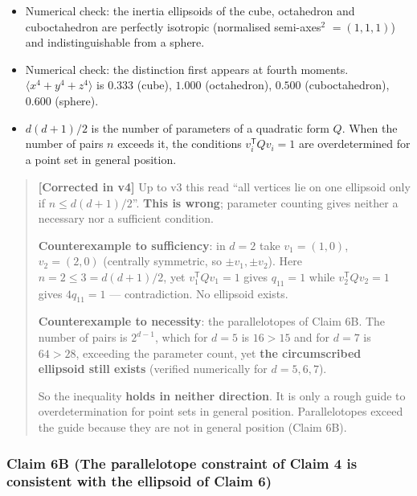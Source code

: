 \documentclass[
  10pt,
]{article}
\providecommand{\tightlist}{%
  \setlength{\itemsep}{0pt}\setlength{\parskip}{0pt}}
\begin{document}
\begin{itemize}
\tightlist
\item
  Numerical check: the inertia ellipsoids of the cube, octahedron and
  cuboctahedron are perfectly isotropic (normalised semi-axes\(^2\)
  \(=(1,1,1)\)) and indistinguishable from a sphere.
\item
  Numerical check: the distinction first appears at fourth moments.
  \(\langle x^4+y^4+z^4\rangle\) is \(0.333\) (cube), \(1.000\)
  (octahedron), \(0.500\) (cuboctahedron), \(0.600\) (sphere).
\item
  \(d(d+1)/2\) is the number of parameters of a quadratic form \(Q\).
  When the number of pairs \(n\) exceeds it, the conditions
  \(v_i^{\mathsf T}Qv_i = 1\) are overdetermined for a point set in
  general position.
\end{itemize}

\begin{quote}
\textbf{{[}Corrected in v4{]}} Up to v3 this read ``all vertices lie on
one ellipsoid only if \(n \le d(d+1)/2\)''. \textbf{This is wrong};
parameter counting gives neither a necessary nor a sufficient condition.

\textbf{Counterexample to sufficiency}: in \(d=2\) take \(v_1=(1,0)\),
\(v_2=(2,0)\) (centrally symmetric, so \(\pm v_1,\pm v_2\)). Here
\(n=2\le3=d(d+1)/2\), yet \(v_1^{\mathsf T}Qv_1=1\) gives \(q_{11}=1\)
while \(v_2^{\mathsf T}Qv_2=1\) gives \(4q_{11}=1\) --- contradiction.
No ellipsoid exists.

\textbf{Counterexample to necessity}: the parallelotopes of Claim 6B.
The number of pairs is \(2^{d-1}\), which for \(d=5\) is \(16>15\) and
for \(d=7\) is \(64>28\), exceeding the parameter count, yet \textbf{the
circumscribed ellipsoid still exists} (verified numerically for
\(d=5,6,7\)).

So the inequality \textbf{holds in neither direction}. It is only a
rough guide to overdetermination for point sets in general position.
Parallelotopes exceed the guide because they are not in general position
(Claim 6B).
\end{quote}

\subsubsection{Claim 6B (The parallelotope constraint of Claim 4 is
consistent with the ellipsoid of Claim
6)}\label{claim-6b-the-parallelotope-constraint-of-claim-4-is-consistent-with-the-ellipsoid-of-claim-6}
\end{document}
